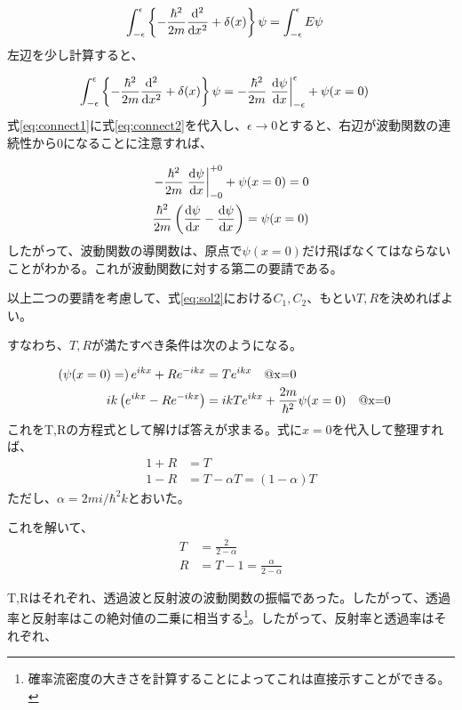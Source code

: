 \documentclass[uplatex,dvipdfmx]{jsarticle}
\begin{document}
\begin{align}
    \int_{-\epsilon}^{\epsilon} \left\{-\frac{\hbar^2}{2m} \dv[2]{}{x} + \delta(x) \right\}\psi &= \int_{-\epsilon}^{\epsilon}E\psi \label{eq:connect1}
\end{align}
左辺を少し計算すると、

\begin{align}
    \int_{-\epsilon}^{\epsilon} \left\{-\frac{\hbar^2}{2m} \dv[2]{}{x} + \delta(x) \right\}\psi &= 
        -\frac{\hbar^2}{2m} \eval{\dv{\psi}{x}}_{-\epsilon}^{\epsilon} + \psi(x=0) \label{eq:connect2}
\end{align}
式\ref{eq:connect1}に式\ref{eq:connect2}を代入し、$\epsilon \rightarrow 0$とすると、右辺が波動関数の連続性から0になることに注意すれば、

\begin{align}
    -\frac{\hbar^2}{2m} \eval{\dv{\psi}{x}}_{-0}^{+0} + \psi(x=0) = 0 \\
    \frac{\hbar^2}{2m} \left(\dv{\psi}{x} (x=+0)-\dv{\psi}{x} (x=-0)\right) = \psi(x=0)
\end{align}
したがって、波動関数の導関数は、原点で$\psi(x=0)$だけ飛ばなくてはならないことがわかる。これが波動関数に対する第二の要請である。


以上二つの要請を考慮して、式\ref{eq:sol2}における$C_1,C_2$、もとい$T,R$を決めればよい。

すなわち、$T,R$が満たすべき条件は次のようになる。

\begin{align}
    \left(\psi(x=0) =\right) e^{ikx} + R e^{-ikx} &= T e^{ikx} \qq{@x=0} \\
    ik\left(e^{ikx} - R e^{-ikx} \right) &= ikT e^{ikx}+\frac{2m}{\hbar^2}\psi(x=0) \qq{@x=0}
\end{align}
これをT,Rの方程式として解けば答えが求まる。式に$x=0$を代入して整理すれば、
\begin{align}
    1 + R &= T \\
    1 - R &= T - \alpha T = (1-\alpha)T   
\end{align}
ただし、$\alpha = 2mi/\hbar^2k$とおいた。

これを解いて、
\begin{align}
    T &= \frac{2}{2-\alpha} \\
    R &= T-1 = \frac{\alpha}{2-\alpha}
\end{align}

T,Rはそれぞれ、透過波と反射波の波動関数の振幅であった。したがって、透過率と反射率はこの絶対値の二乗に相当する\footnote{確率流密度の大きさを計算することによってこれは直接示すことができる。}。したがって、反射率と透過率はそれぞれ、
\end{document}
